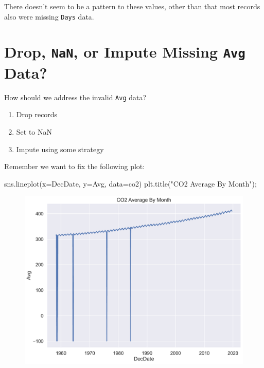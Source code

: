 \documentclass[
  letterpaper,
  DIV=11,
  numbers=noendperiod]{scrreprt}
\newenvironment{Shaded}{\begin{snugshade}}{\end{snugshade}}
\newcommand{\NormalTok}[1]{\textcolor[rgb]{0.00,0.23,0.31}{#1}}
\newcommand{\OperatorTok}[1]{\textcolor[rgb]{0.37,0.37,0.37}{#1}}
\newcommand{\StringTok}[1]{\textcolor[rgb]{0.13,0.47,0.30}{#1}}
\providecommand{\tightlist}{%
  \setlength{\itemsep}{0pt}\setlength{\parskip}{0pt}}\usepackage{longtable,booktabs,array}
\begin{document}
There doesn't seem to be a pattern to these values, other than that most
records also were missing \texttt{Days} data.

\hypertarget{drop-nan-or-impute-missing-avg-data}{%
\section{\texorpdfstring{Drop, \texttt{NaN}, or Impute Missing
\texttt{Avg}
Data?}{Drop, NaN, or Impute Missing Avg Data?}}\label{drop-nan-or-impute-missing-avg-data}}

How should we address the invalid \texttt{Avg} data?

\begin{enumerate}
\def\labelenumi{\arabic{enumi}.}
\tightlist
\item
  Drop records
\item
  Set to NaN
\item
  Impute using some strategy
\end{enumerate}

Remember we want to fix the following plot:

\begin{Shaded}
\begin{Highlighting}[]
\NormalTok{sns.lineplot(x}\OperatorTok{=}\StringTok{\textquotesingle{}DecDate\textquotesingle{}}\NormalTok{, y}\OperatorTok{=}\StringTok{\textquotesingle{}Avg\textquotesingle{}}\NormalTok{, data}\OperatorTok{=}\NormalTok{co2)}
\NormalTok{plt.title(}\StringTok{"CO2 Average By Month"}\NormalTok{)}\OperatorTok{;}
\end{Highlighting}
\end{Shaded}

\begin{figure}[H]

{\centering \includegraphics{eda/eda_files/figure-pdf/cell-71-output-1.pdf}

}

\end{figure}
\end{document}
